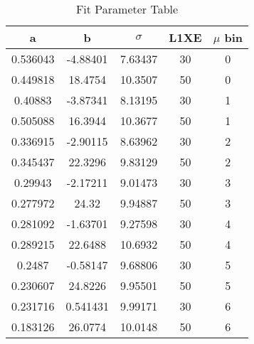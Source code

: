 \begin{table}[ht]
\caption{Fit Parameter Table}
\centering
\begin{tabular}{|c|c|c|c|c|}
\hline\hline
a & b & $\sigma$ & L1XE & $\mu$ bin\\ 
\hline
0.536043 & -4.88401 & 7.63437 & 30 & 0\\ 
0.449818 & 18.4754 & 10.3507 & 50 & 0\\ 
0.40883 & -3.87341 & 8.13195 & 30 & 1\\ 
0.505088 & 16.3944 & 10.3677 & 50 & 1\\ 
0.336915 & -2.90115 & 8.63962 & 30 & 2\\ 
0.345437 & 22.3296 & 9.83129 & 50 & 2\\ 
0.29943 & -2.17211 & 9.01473 & 30 & 3\\ 
0.277972 & 24.32 & 9.94887 & 50 & 3\\ 
0.281092 & -1.63701 & 9.27598 & 30 & 4\\ 
0.289215 & 22.6488 & 10.6932 & 50 & 4\\ 
0.2487 & -0.58147 & 9.68806 & 30 & 5\\ 
0.230607 & 24.8226 & 9.95501 & 50 & 5\\ 
0.231716 & 0.541431 & 9.99171 & 30 & 6\\ 
0.183126 & 26.0774 & 10.0148 & 50 & 6\\ 
\hline
\end{tabular}
\end{table}
